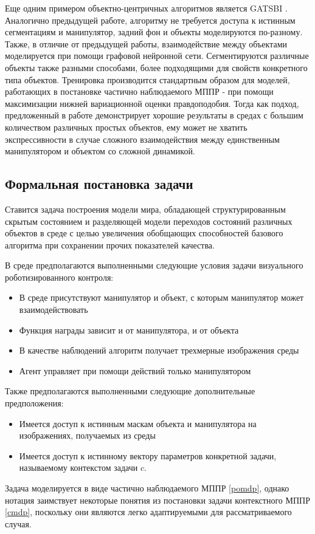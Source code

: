 Еще одним примером объектно-центричных алгоритмов является GATSBI \cite{GATSBI}. Аналогично предыдущей работе, алгоритму не требуется доступа к истинным сегментациям и манипулятор, задний фон и объекты моделируются по-разному. Также, в отличие от предыдущей работы, взаимодействие между объектами моделируется при помощи графовой нейронной сети. Сегментируются различные объекты также разными способами, более подходящими для свойств конкретного типа объектов. Тренировка производится стандартным образом для моделей, работающих в постановке частично наблюдаемого МППР - при помощи максимизации нижней вариационной оценки правдоподобия. Тогда как подход, предложенный в работе демонстрирует хорошие результаты в средах с большим количеством различных простых объектов, ему может не хватить экспрессивности в случае сложного взаимодействия между единственным манипулятором и объектом со сложной динамикой.

\subsection{Формальная постановка задачи}
Ставится задача построения модели мира, обладающей структурированным скрытым состоянием и разделяющей модели переходов состояний различных объектов в среде с целью увеличения обобщающих способностей базового алгоритма при сохранении прочих показателей качества.

В среде предполагаются выполненными следующие условия задачи визуального роботизированного контроля:
\begin{itemize}
    \item В среде присутствуют манипулятор и объект, с которым манипулятор может взаимодействовать
    \item Функция награды зависит и от манипулятора, и от объекта
    \item В качестве наблюдений алгоритм получает трехмерные изображения среды
    \item Агент управляет при помощи действий только манипулятором
\end{itemize}
Также предполагаются выполненными следующие дополнительные предположения:
\begin{itemize}
    \item Имеется доступ к истинным маскам объекта и манипулятора на изображениях, получаемых из среды
    \item Имеется доступ к истинному вектору параметров конкретной задачи, называемому контекстом задачи $c$.
\end{itemize}
Задача моделируется в виде частично наблюдаемого МППР \ref{pomdp}, однако нотация заимствует некоторые понятия из постановки задачи контекстного МППР \ref{cmdp}, поскольку они являются легко адаптируемыми для рассматриваемого случая.

